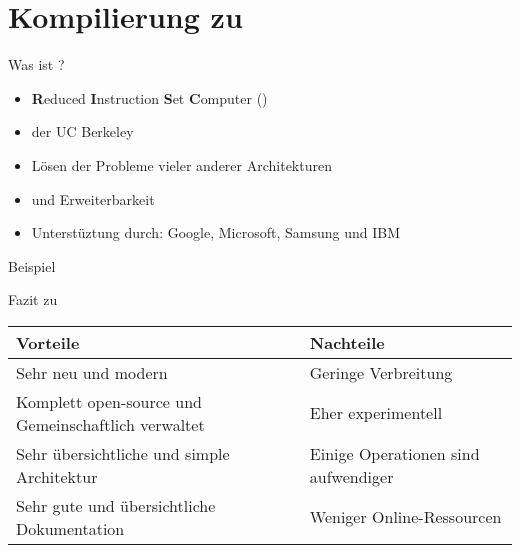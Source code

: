 \section{Kompilierung zu \riscv}
\begin{frame}{Was ist \riscv?}

	\begin{itemize}
		\item<1-> \textbf{R}educed \textbf{I}nstruction \textbf{S}et \textbf{C}omputer ()
		\item<2->  der UC Berkeley
		\item<3-> Lösen der Probleme vieler anderer Architekturen
		\item<4->  und Erweiterbarkeit
		\item<5-> Unterstüztung durch: Google, Microsoft, Samsung und IBM
	\end{itemize}
\end{frame}

\begin{frame}{Beispiel}
	\begin{minipage}{0.4\textwidth}
		\vspace{.5cm}
		\centering
		\vspace{-.5cm}
	\end{minipage}
	\hfill
	\begin{minipage}{0.4\textwidth}
	\end{minipage}
\end{frame}

\begin{frame}{Fazit zu \riscv}
	\begin{table}[h]
		\begin{tabularx}{0.95\textwidth}{L|L}
			 Vorteile                       &  Nachteile        \\
			\hline
			Sehr neu und modern                                 & Geringe Verbreitung                 \\
			Komplett open-source und Gemeinschaftlich verwaltet & Eher experimentell                  \\
			Sehr übersichtliche und simple Architektur          & Einige Operationen sind aufwendiger \\
			Sehr gute und übersichtliche Dokumentation          & Weniger Online-Ressourcen           \\
		\end{tabularx}
	\end{table}
\end{frame}
